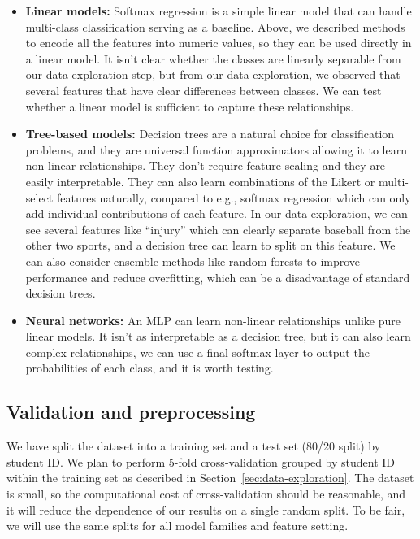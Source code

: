 \documentclass[12pt]{article}
\begin{document}
\begin{itemize}
  \item \textbf{Linear models:} Softmax regression is a simple linear model that can handle multi-class classification serving 
  as a baseline. Above, we described methods to encode all the features into numeric values, so they can be used directly in a linear model.
  It isn't clear whether the classes are linearly separable from our data exploration step, but from our data exploration, we observed
  that several features that have clear differences between classes. We can test whether a linear model is sufficient to capture these relationships.
  \item \textbf{Tree-based models:} Decision trees are a natural choice for classification problems, and they are universal function
  approximators allowing it to learn non-linear relationships. They don't require feature scaling and they are easily interpretable. 
  They can also learn combinations of the Likert or multi-select features naturally, compared to e.g., softmax regression which can only add 
  individual contributions of each feature. In our data exploration, we can see several features like ``injury'' which can clearly separate
  baseball from the other two sports, and a decision tree can learn to split on this feature. We can also consider ensemble methods like random forests to 
  improve performance and reduce overfitting, which can be a disadvantage of standard decision trees.
  \item \textbf{Neural networks:} An MLP can learn non-linear relationships unlike pure linear models. It isn't as interpretable as a decision tree,
  but it can also learn complex relationships, we can use a final softmax layer to output the probabilities of each class, and it is worth testing.
\end{itemize}

\subsection{Validation and preprocessing}

We have split the dataset into a training set and a test set (80/20 split) by student ID.
We plan to perform 5-fold cross-validation grouped by student ID within the training set
as described in Section~\ref{sec:data-exploration}. The dataset is small, so the computational
cost of cross-validation should be reasonable, and it will reduce the dependence of our results
on a single random split. To be fair, we will use the same splits for all model families and feature setting.
\end{document}
